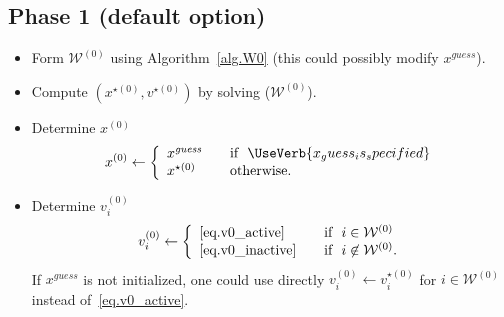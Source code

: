 \documentclass[12pt,a4paper]{article}
\begin{document}
\subsection{Phase 1 (default option)} \label{sec.phase1}

\begin{itemize}
\item Form $\mathcal{W}^{(0)}$ using Algorithm~\ref{alg.W0} (this could possibly modify $x^{\mathit{guess}}$).
\item Compute $(x^{\star(0)},v^{\star(0)})$ by solving ($\mathcal{W}^{(0)}$).
\item Determine $x^{(0)}$
    \begin{align*}
      x^{(0)} \leftarrow \left\{
      \begin{array}{l l}
        x^{\mathit{guess}} & \quad \text{if} \,\,\,\, \UseVerb{x_guess_is_specified} \\
        x^{\star(0)} & \quad \text{otherwise}.
      \end{array} \right.
    \end{align*}

\item Determine $v_i^{(0)}$
%
    \begin{align*}
      v_i^{(0)} \leftarrow \left\{
      \begin{array}{l l}
        \eqref{eq.v0_active} & \quad \text{if} \,\,\,\, i\in\mathcal{W}^{(0)} \\
        \eqref{eq.v0_inactive} & \quad \text{if} \,\,\,\, i\not\in\mathcal{W}^{(0)}.
      \end{array} \right.
    \end{align*}
    If $x^{\mathit{guess}}$ is not initialized, one could use directly $v_i^{(0)} \leftarrow v_i^{\star(0)}$
    for $i\in\mathcal{W}^{(0)}$ instead of~\eqref{eq.v0_active}.


\end{itemize}
\end{document}
